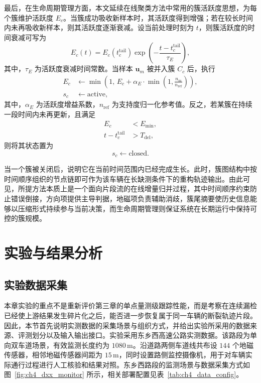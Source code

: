 \documentclass{xdupgthesis}
\begin{document}
最后，在生命周期管理方面，本文延续在线聚类方法中常用的簇活跃度思想，为每个簇维护活跃度 $E_c$。当簇成功吸收新样本时，其活跃度得到增强；若在较长时间内未再吸收新样本，则其活跃度逐渐衰减。设当前处理时刻为 $t$，则簇活跃度的时间衰减可写为
\begin{equation}
	E_c(t)=E_c(t_c^{\mathrm{tail}})
	\exp
	\left(
	-\frac{t-t_c^{\mathrm{tail}}}{\tau_E}
	\right),
\end{equation}
其中，$\tau_E$ 为活跃度衰减时间常数。当样本 $\mathbf{u}_m$ 被并入簇 $C_c$ 后，执行
\begin{equation}
	\begin{aligned}
		E_c&\leftarrow
		\min
		\left(
		1,\,
		E_c+\alpha_E\cdot \min\left(1,\frac{n_m}{n_{\mathrm{ref}}}\right)
		\right),\\
		s_c&\leftarrow \mathrm{active},
	\end{aligned}
\end{equation}
其中，$\alpha_E$ 为活跃度增益系数，$n_{\mathrm{ref}}$ 为支持度归一化参考值。反之，若某簇在持续一段时间内未再更新，且满足
\begin{equation}
	\begin{aligned}
		E_c&<E_{\min},\\
		t-t_c^{\mathrm{tail}}&>T_{\mathrm{del}},
	\end{aligned}
\end{equation}
则将其状态置为
\begin{equation}
	s_c\leftarrow \mathrm{closed}.
\end{equation}

当一个簇被关闭后，说明它在当前时间范围内已经完成生长。此时，簇图结构中按时间顺序组织的节点链即可作为该车辆在长缺测条件下的重构轨迹输出。由此可见，所提方法本质上是一个面向片段流的在线增量归并过程，其中时间顺序约束防止错误倒接，方向项提供主导判据，地磁项负责辅助消歧，簇尾摘要使历史信息能够以压缩形式持续参与当前决策，而生命周期管理则保证系统在长期运行中保持可控的簇规模。

\section{实验与结果分析}

\subsection{实验数据采集}

本章实验的重点不是重新评价第三章的单点量测级跟踪性能，而是考察在连续漏检已经使上游结果发生碎片化之后，能否进一步恢复属于同一车辆的断裂轨迹片段。因此，本节首先说明实测数据的采集场景与组织方式，并给出实验所采用的数据来源、评测划分以及输入输出接口。实验采用东乡西高速公路实测数据。该路段为单向双车道场景，有效监测长度约为 $1080\,\mathrm{m}$。沿道路两侧车道线共布设 $144$ 个地磁传感器，相邻地磁传感器间距为 $15\,\mathrm{m}$，同时设置路侧监控摄像机，用于对车辆实际通行过程进行人工核验和结果对照。东乡西路段的监测场景与数据采集方式如图~\ref{fig:ch4_dxx_monitor} 所示，相关部署配置见表~\ref{tab:ch4_data_config}。
\end{document}
